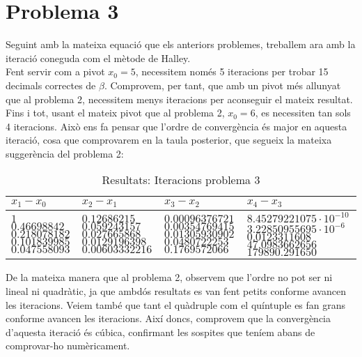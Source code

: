 \documentclass[11pt]{article}
\begin{document}
\section*{Problema 3}
	Seguint amb la mateixa equació que els anteriors problemes, treballem ara amb la iteració coneguda com el mètode de Halley.\\
	Fent servir com a pivot $x_0 = 5$, necessitem només 5 iteracions per trobar 15 decimals correctes de $\beta$. Comprovem, per tant, que amb un pivot més allunyat que al problema 2, necessitem menys iteracions per aconseguir el mateix resultat. Fins i tot, usant el mateix pivot que al problema 2, $x_0 = 6$, es necessiten tan sols 4 iteracions. Això ens fa pensar que l'ordre de convergència és major en aquesta iteració, cosa que comprovarem en la taula posterior, que segueix la mateixa suggerència del problema 2:
	\begin{table}[H]
		\begin{center}
			\begin{tabular}[c]{|p{25mm}|p{27mm}|p{27mm}|p{35mm}|}
			\hline 
			$x_1 - x_0$& $x_2 - x_1$ & $x_3 - x_2$ & $x_4 - x_3$ \\ 
			\hline 
			$1$\newline
			$0.46698842$
			$0.218078182$
			$0.101839985$
			$0.047558093$
			& 
			$0.12686215$
			$0.059243157$
			$0.027665868$
			$0.0129196398$
			$0.00603332216$
			& 
			$0.00096376721$
			$0.00354769415$
			$0.01305930902$
			$0.0480722253$
			$0.1769572066$
			&
			$8.45279221075 \cdot 10^{-10}$
			$3.22850955695 \cdot 10^{-6}$
			$0.0123311608$
			$47.0983662656$
			$179890.291650$
			\\
			\hline
			\end{tabular}
		\caption{Resultats: Iteracions problema 3}
		\end{center}
	\end{table}
	De la mateixa manera que al problema 2, observem que l'ordre no pot ser ni lineal ni quadràtic, ja que ambdós resultats es van fent petits conforme avancen les iteracions. Veiem també que tant el quàdruple com el quíntuple es fan grans conforme avancen les iteracions. Així doncs, comprovem que la convergència d'aquesta iteració és cúbica, confirmant les sospites que teníem abans de comprovar-ho numèricament.
	\newpage
\end{document}
